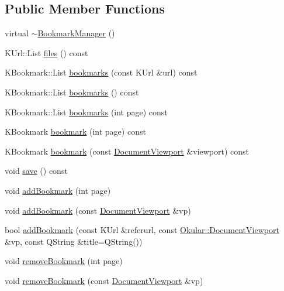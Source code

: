 \subsection*{Public Member Functions}
\begin{DoxyCompactItemize}
\item 
virtual \hyperlink{classOkular_1_1BookmarkManager_a1069f28ac38e9c854e04a8aec6a32ba5}{$\sim$\+Bookmark\+Manager} ()
\item 
K\+Url\+::\+List \hyperlink{classOkular_1_1BookmarkManager_aa97bab16634951bc92dd567208fdca80}{files} () const 
\item 
K\+Bookmark\+::\+List \hyperlink{classOkular_1_1BookmarkManager_a35ec51e7751b9bde6bffb9ad339ffdfd}{bookmarks} (const K\+Url \&url) const 
\item 
K\+Bookmark\+::\+List \hyperlink{classOkular_1_1BookmarkManager_a770db9f97ee4d9069c0d417017caa4d3}{bookmarks} () const 
\item 
K\+Bookmark\+::\+List \hyperlink{classOkular_1_1BookmarkManager_af65fc427552b4e653ae253a69cc53828}{bookmarks} (int page) const 
\item 
K\+Bookmark \hyperlink{classOkular_1_1BookmarkManager_aeda7ddc73c05fb51f03a031d95cccb9d}{bookmark} (int page) const 
\item 
K\+Bookmark \hyperlink{classOkular_1_1BookmarkManager_a3b314eb1e853ca56751a61182fe553d1}{bookmark} (const \hyperlink{classOkular_1_1DocumentViewport}{Document\+Viewport} \&viewport) const 
\item 
void \hyperlink{classOkular_1_1BookmarkManager_af277e57ed79d0fce59f00a62f6e0f7b5}{save} () const 
\item 
void \hyperlink{classOkular_1_1BookmarkManager_adc5509fdb789024dc10bac5c3c1457b2}{add\+Bookmark} (int page)
\item 
void \hyperlink{classOkular_1_1BookmarkManager_a34863b6bfe042e738e14950e4f5c27b8}{add\+Bookmark} (const \hyperlink{classOkular_1_1DocumentViewport}{Document\+Viewport} \&vp)
\item 
bool \hyperlink{classOkular_1_1BookmarkManager_a9f859d109d8a4edb1576ccfcedc84232}{add\+Bookmark} (const K\+Url \&referurl, const \hyperlink{classOkular_1_1DocumentViewport}{Okular\+::\+Document\+Viewport} \&vp, const Q\+String \&title=Q\+String())
\item 
void \hyperlink{classOkular_1_1BookmarkManager_a3e763f31a1595a68b4df6e8419ea47ac}{remove\+Bookmark} (int page)
\item 
void \hyperlink{classOkular_1_1BookmarkManager_ad9b6b11a42b0522ad80b52303e939fc3}{remove\+Bookmark} (const \hyperlink{classOkular_1_1DocumentViewport}{Document\+Viewport} \&vp)

\end{DoxyCompactItemize}
